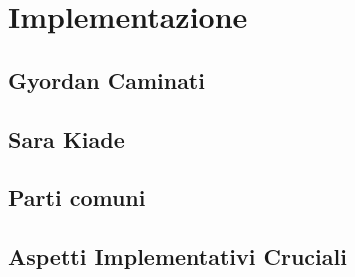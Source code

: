 \chapter{Implementazione}



\section{Gyordan Caminati}
\section{Sara Kiade}
\section{Parti comuni}
\section{Aspetti Implementativi Cruciali}